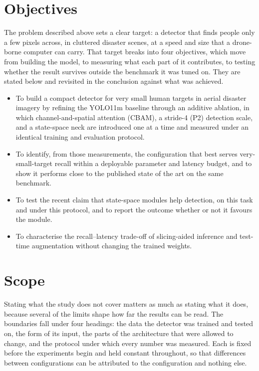 \section{Objectives}

The problem described above sets a clear target: a detector that finds people
only a few pixels across, in cluttered disaster scenes, at a speed and size that
a drone-borne computer can carry. That target breaks into four objectives, which
move from building the model, to measuring what each part of it contributes, to
testing whether the result survives outside the benchmark it was tuned on. They
are stated below and revisited in the conclusion against what was achieved.

\begin{itemize}
  \item To build a compact detector for very small human targets in aerial
        disaster imagery by refining the YOLO11m baseline through an additive
        ablation, in which channel-and-spatial attention (CBAM), a stride-4
        (P2) detection scale, and a state-space neck are introduced one at a
        time and measured under an identical training and evaluation protocol.
  \item To identify, from those measurements, the configuration that best
        serves very-small-target recall within a deployable parameter and
        latency budget, and to show it performs close to the published state
        of the art on the same benchmark.
  \item To test the recent claim that state-space modules help detection, on
        this task and under this protocol, and to report the outcome whether
        or not it favours the module.
  \item To characterise the recall--latency trade-off of slicing-aided
        inference and test-time augmentation without changing the trained
        weights.
\end{itemize}

\section{Scope}

Stating what the study does not cover matters as much as stating what it does,
because several of the limits shape how far the results can be read. The
boundaries fall under four headings: the data the detector was trained and tested
on, the form of its input, the parts of the architecture that were allowed to
change, and the protocol under which every number was measured. Each is fixed
before the experiments begin and held constant throughout, so that differences
between configurations can be attributed to the configuration and nothing else.

